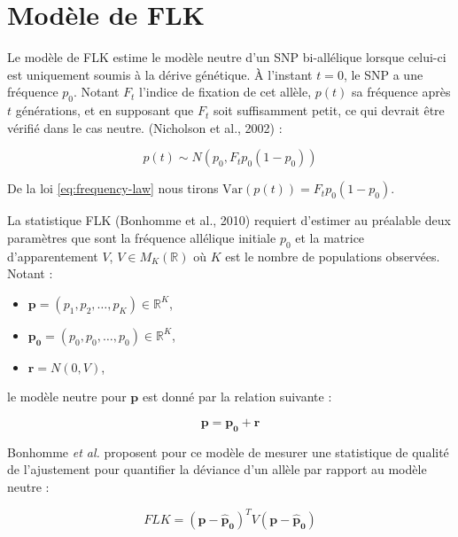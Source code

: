 \documentclass[12pt,twoside]{reedthesis}
\begin{document}
  \section{Modèle de FLK}\label{modele-de-flk}
  
  Le modèle de FLK estime le modèle neutre d'un SNP bi-allélique lorsque
  celui-ci est uniquement soumis à la dérive génétique. À l'instant
  \(t = 0\), le SNP a une fréquence \(p_0\). Notant \(F_t\) l'indice de
  fixation de cet allèle, \(p(t)\) sa fréquence après \(t\) générations,
  et en supposant que \(F_t\) soit suffisamment petit, ce qui devrait être
  vérifié dans le cas neutre. (Nicholson et al., 2002) :
  
  \begin{equation} 
    p(t) \sim N(p_0, F_t p_0 (1-p_0)) 
    \label{eq:frequency-law}
  \end{equation}
  
  De la loi \eqref{eq:frequency-law} nous tirons
  \(\text{Var}(p(t)) = F_t p_0 (1-p_0)\).
  
  La statistique FLK (Bonhomme et al., 2010) requiert d'estimer au
  préalable deux paramètres que sont la fréquence allélique initiale
  \(p_0\) et la matrice d'apparentement \(V\), \(V \in M_K(\mathbb{R})\)
  où \(K\) est le nombre de populations observées. Notant :
  
  \begin{itemize}
  \item
    \(\boldsymbol{p} = (p_1, p_2, \dots, p_K) \in \mathbb{R}^K\),
  \item
    \(\boldsymbol{p_0} = (p_0, p_0, \dots, p_0) \in \mathbb{R}^K\),
  \item
    \(\boldsymbol{r} = N(0, V)\),
  \end{itemize}
  
  le modèle neutre pour \(\boldsymbol{p}\) est donné par la relation
  suivante :
  
  \begin{equation} 
    \boldsymbol{p} = \boldsymbol{p_0} + \boldsymbol{r} 
    \label{eq:flk_neutral_model}
  \end{equation}
  
  Bonhomme \textit{et al.} proposent pour ce modèle de mesurer une
  statistique de qualité de l'ajustement pour quantifier la déviance d'un
  allèle par rapport au modèle neutre :
  
  \begin{equation} 
    FLK = (\boldsymbol{p - \hat{p}_0})^T V (\boldsymbol{p - \hat{p}_0})                                \label{eq:flk-statistic}
  \end{equation}
  
\end{document}
